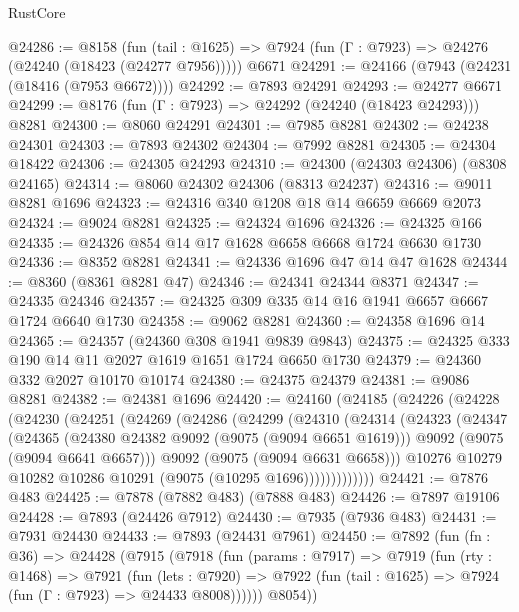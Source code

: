 \begin{lexlean}{RustCore}
\begin{coremodule}
@24286 := @8158
    (fun (tail : @1625) => @7924 (fun (Γ : @7923) => @24276 (@24240 (@18423 (@24277 @7956)))))
    @6671
@24291 := @24166 (@7943 (@24231 (@18416 (@7953 @6672))))
@24292 := @7893 @24291
@24293 := @24277 @6671
@24299 := @8176 (fun (Γ : @7923) => @24292 (@24240 (@18423 @24293))) @8281
@24300 := @8060 @24291
@24301 := @7985 @8281
@24302 := @24238 @24301
@24303 := @7893 @24302
@24304 := @7992 @8281
@24305 := @24304 @18422
@24306 := @24305 @24293
@24310 := @24300 (@24303 @24306) (@8308 @24165)
@24314 := @8060 @24302 @24306 (@8313 @24237)
@24316 := @9011 @8281 @1696
@24323 := @24316 @340 @1208 @18 @14 @6659 @6669 @2073
@24324 := @9024 @8281
@24325 := @24324 @1696
@24326 := @24325 @166
@24335 := @24326 @854 @14 @17 @1628 @6658 @6668 @1724 @6630 @1730
@24336 := @8352 @8281
@24341 := @24336 @1696 @47 @14 @47 @1628
@24344 := @8360 (@8361 @8281 @47)
@24346 := @24341 @24344 @8371
@24347 := @24335 @24346
@24357 := @24325 @309 @335 @14 @16 @1941 @6657 @6667 @1724 @6640 @1730
@24358 := @9062 @8281
@24360 := @24358 @1696 @14
@24365 := @24357 (@24360 @308 @1941 @9839 @9843)
@24375 := @24325 @333 @190 @14 @11 @2027 @1619 @1651 @1724 @6650 @1730
@24379 := @24360 @332 @2027 @10170 @10174
@24380 := @24375 @24379
@24381 := @9086 @8281
@24382 := @24381 @1696
@24420 := @24160
    (@24185
      (@24226
        (@24228
          (@24230
            (@24251
              (@24269
                (@24286
                  (@24299
                    (@24310
                      (@24314
                        (@24323
                          (@24347
                            (@24365
                              (@24380 @24382 @9092 (@9075 (@9094 @6651 @1619)))
                              @9092
                              (@9075 (@9094 @6641 @6657)))
                            @9092
                            (@9075 (@9094 @6631 @6658)))
                          @10276
                          @10279
                          @10282
                          @10286
                          @10291
                          (@9075 (@10295 @1696)))))))))))))
@24421 := @7876 @483
@24425 := @7878 (@7882 @483) (@7888 @483)
@24426 := @7897 @19106
@24428 := @7893 (@24426 @7912)
@24430 := @7935 (@7936 @483)
@24431 := @7931 @24430
@24433 := @7893 (@24431 @7961)
@24450 := @7892
    (fun (fn : @36) =>
    @24428
      (@7915
        (@7918
          (fun (params : @7917) =>
          @7919
            (fun (rty : @1468) =>
            @7921
              (fun (lets : @7920) =>
              @7922 (fun (tail : @1625) => @7924 (fun (Γ : @7923) => @24433 @8008))))))
        @8054))

\end{coremodule}
\end{lexlean}
